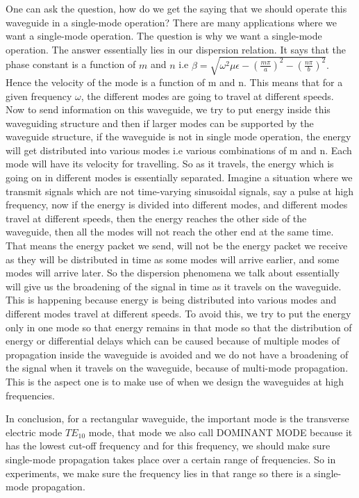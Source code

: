 One can ask the question, how do we get the saying that we should operate this waveguide in a single-mode operation? There are many applications where we want a single-mode operation. The question is why we want a single-mode operation. The answer essentially lies in our dispersion relation. It says that the phase constant is a function of $m$ and $n$ i.e $\beta = \sqrt{{\omega}^2\mu\epsilon - (\frac{m\pi}{a})^2 - (\frac{n\pi}{b})^2}.$ Hence the velocity of the mode is a function of m and n. This means that for a given frequency $\omega$, the different modes are going to travel at different speeds. Now to send information on this waveguide, we try to put energy inside this waveguiding structure and then if larger modes can be supported by the waveguide structure, if the waveguide is not in single mode operation, the energy will get distributed into various modes i.e various combinations of m and n. Each mode will have its velocity for travelling. So as it travels, the energy which is going on in different modes is essentially separated. Imagine a situation where we transmit signals which are not time-varying sinusoidal signals, say a pulse at high frequency, now if the energy is divided into different modes, and different modes travel at different speeds, then the energy reaches the other side of the waveguide, then all the modes will not reach the other end at the same time. That means the energy packet we send, will not be the energy packet we receive as they will be distributed in time as some modes will arrive earlier, and some modes will arrive later. So the dispersion phenomena we talk about essentially will give us the broadening of the signal in time as it travels on the waveguide. This is happening because energy is being distributed into various modes and different modes travel at different speeds. To avoid this, we try to put the energy only in one mode so that energy remains in that mode so that the distribution of energy or differential delays which can be caused because of multiple modes of propagation inside the waveguide is avoided and we do not have a broadening of the signal when it travels on the waveguide, because of multi-mode propagation. This is the aspect one is to make use of when we design the waveguides at high frequencies.

In conclusion, for a rectangular waveguide, the important mode is the transverse electric mode $TE_{10}$ mode, that mode we also call DOMINANT MODE because it has the lowest cut-off frequency and for this frequency, we should make sure single-mode propagation takes place over a certain range of frequencies. So in experiments, we make sure the frequency lies in that range so there is a single-mode propagation.